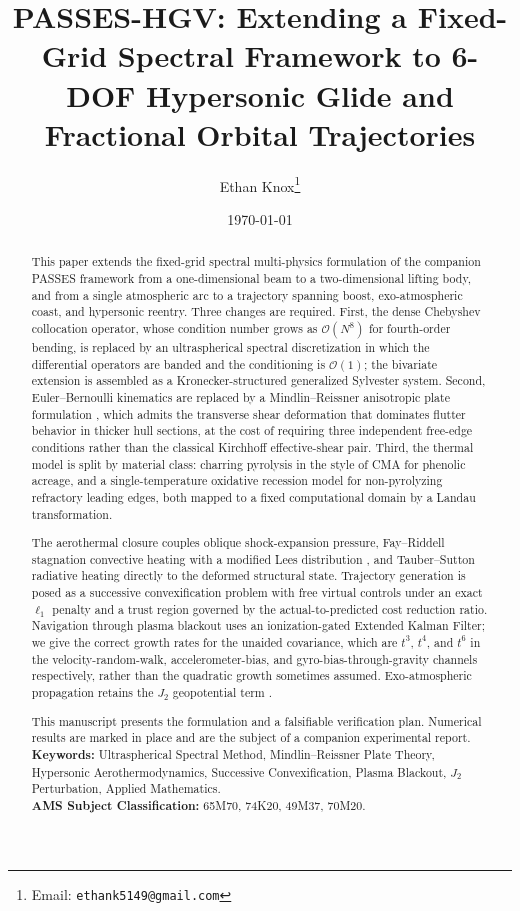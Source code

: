 \documentclass[11pt,a4paper]{article}
\title{PASSES-HGV: Extending a Fixed-Grid Spectral Framework to 6-DOF Hypersonic Glide and Fractional Orbital Trajectories}
\author[1]{Ethan Knox\thanks{Email: \texttt{ethank5149@gmail.com}}}
\affil[1]{Independent Researcher, Champaign, IL, USA}
\date{\today}
\theoremstyle{definition}
\numberwithin{equation}{section}
\begin{document}
\maketitle

\begin{abstract}
This paper extends the fixed-grid spectral multi-physics formulation of the companion PASSES framework \cite{knox2026passes} from a one-dimensional beam to a two-dimensional lifting body, and from a single atmospheric arc to a trajectory spanning boost, exo-atmospheric coast, and hypersonic reentry. Three changes are required. First, the dense Chebyshev collocation operator, whose condition number grows as $\mathcal{O}(N^8)$ for fourth-order bending, is replaced by an ultraspherical spectral discretization \cite{olver2013, townsend2015} in which the differential operators are banded and the conditioning is $\mathcal{O}(1)$; the bivariate extension is assembled as a Kronecker-structured generalized Sylvester system. Second, Euler--Bernoulli kinematics are replaced by a Mindlin--Reissner anisotropic plate formulation \cite{mindlin1951, reissner1945}, which admits the transverse shear deformation that dominates flutter behavior in thicker hull sections, at the cost of requiring three independent free-edge conditions rather than the classical Kirchhoff effective-shear pair. Third, the thermal model is split by material class: charring pyrolysis in the style of CMA \cite{moyer1968} for phenolic acreage, and a single-temperature oxidative recession model for non-pyrolyzing refractory leading edges, both mapped to a fixed computational domain by a Landau transformation.

The aerothermal closure couples oblique shock-expansion pressure, Fay--Riddell stagnation convective heating \cite{fay1958} with a modified Lees distribution \cite{lees1956}, and Tauber--Sutton radiative heating \cite{tauber1991} directly to the deformed structural state. Trajectory generation is posed as a successive convexification problem \cite{mao2016, szmuk2020} with free virtual controls under an exact $\ell_1$ penalty and a trust region governed by the actual-to-predicted cost reduction ratio. Navigation through plasma blackout uses an ionization-gated Extended Kalman Filter; we give the correct growth rates for the unaided covariance, which are $t^3$, $t^4$, and $t^6$ in the velocity-random-walk, accelerometer-bias, and gyro-bias-through-gravity channels respectively, rather than the quadratic growth sometimes assumed. Exo-atmospheric propagation retains the $J_2$ geopotential term \cite{vallado2013}.

This manuscript presents the formulation and a falsifiable verification plan. Numerical results are marked in place and are the subject of a companion experimental report.
\\[2ex]
\textbf{Keywords:} Ultraspherical Spectral Method, Mindlin--Reissner Plate Theory, Hypersonic Aerothermodynamics, Successive Convexification, Plasma Blackout, $J_2$ Perturbation, Applied Mathematics.
\\[1ex]
\textbf{AMS Subject Classification:} 65M70, 74K20, 49M37, 70M20.
\end{abstract}
\end{document}
